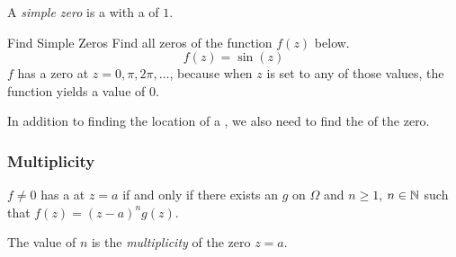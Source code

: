 \begin{definition}\label{def:Simple_Zero}
  A \emph{simple zero} is a  with a  of $1$.
\end{definition}

\begin{example}{Find Simple Zeros}
  Find all zeros of the function $f(z)$ below.
  \begin{equation*}
    f(z) = \sin(z)
  \end{equation*}
  \tcblower{}
  $f$ has a zero at $z=0, \pi, 2\pi, \ldots$, because when $z$ is set to any of those values, the function yields a value of $0$.
\end{example}

In addition to finding the location of a , we also need to find the  of the zero.

\subsubsection{Multiplicity}\label{subsubsec:Multiplicity}
\begin{theorem}[Multiplicity]\label{thm:Multiplicity}
  $f \neq0$ has a  at $z=a$ if and only if there exists an   $g$ on $\Omega$ and $n \geq 1$, $n \in \operatorname{\mathbb{N}}$ such that $f(z) = {(z-a)}^{n} g(z)$.

  The value of $n$ is the \emph{multiplicity} of the zero $z=a$.
\end{theorem}

